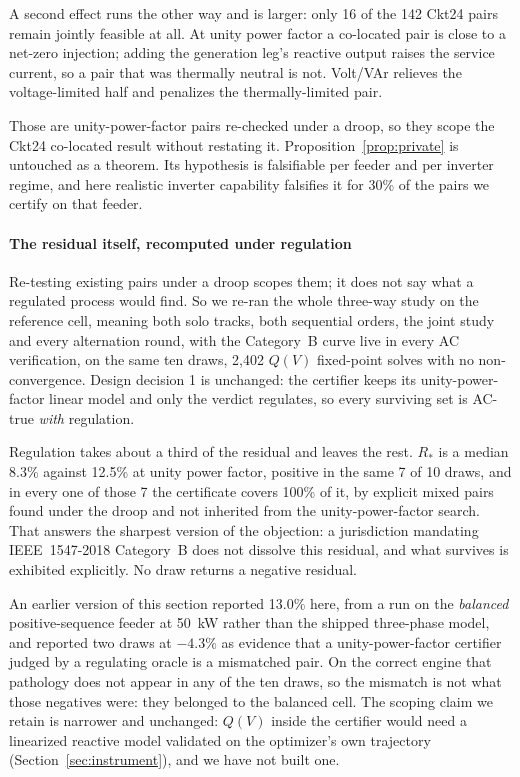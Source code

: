 \documentclass[review,authoryear,12pt]{elsarticle}
\begin{document}
A second effect runs the other way and is larger: only 16 of the 142 Ckt24
pairs remain jointly feasible at all. At unity power factor a co-located pair
is close to a net-zero injection; adding the generation leg's reactive output
raises the service current, so a pair that was thermally neutral is not.
Volt/VAr relieves the voltage-limited half and penalizes the
thermally-limited pair.

Those are unity-power-factor pairs re-checked under a droop, so they scope the
Ckt24 co-located result without restating it. Proposition~\ref{prop:private} is
untouched as a theorem. Its hypothesis is falsifiable per feeder and per
inverter regime, and here realistic inverter capability falsifies it for 30\%
of the pairs we certify on that feeder.

\paragraph{The residual itself, recomputed under regulation}
Re-testing existing pairs under a droop scopes them; it does not say what a
regulated process would find. So we re-ran the whole three-way study on the
reference cell, meaning both solo tracks, both sequential orders, the joint
study and every alternation round, with the Category~B curve live in every AC
verification, on the same ten draws, 2{,}402 $Q(V)$ fixed-point solves with no
non-convergence. Design decision 1 is unchanged: the certifier keeps its
unity-power-factor linear model and only the verdict regulates, so every
surviving set is AC-true \emph{with} regulation.

Regulation takes about a third of the residual and leaves the rest.
$R_{\ast}$ is a median 8.3\% against 12.5\% at unity power factor, positive in
the same 7 of 10 draws, and in every one of those 7 the certificate covers
100\% of it, by explicit mixed pairs found under the droop and not inherited
from the unity-power-factor search. That answers the sharpest
version of the objection: a jurisdiction mandating IEEE~1547-2018 Category~B
does not dissolve this residual, and what survives is exhibited explicitly. No
draw returns a negative residual.

An earlier version of this section reported 13.0\% here, from a run on the
\emph{balanced} positive-sequence feeder at 50~kW rather than the shipped
three-phase model, and reported two draws at $-4.3\%$ as evidence that a
unity-power-factor certifier judged by a regulating oracle is a mismatched
pair. On the correct engine that pathology does not appear in any of the ten
draws, so the mismatch is not what those negatives were: they belonged to the
balanced cell. The scoping claim we retain is narrower and unchanged: $Q(V)$
inside the certifier would need a linearized reactive model validated on the
optimizer's own trajectory (Section~\ref{sec:instrument}), and we have not
built one.
\end{document}
